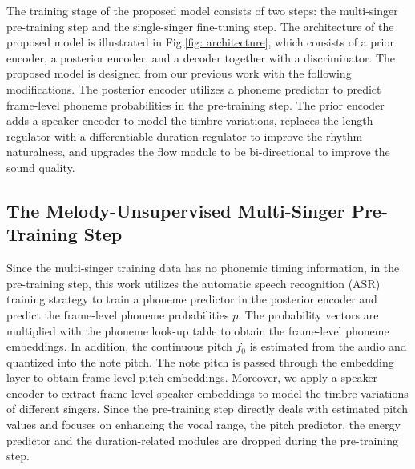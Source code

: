 The training stage of the proposed model consists of two steps: the multi-singer pre-training step and the single-singer fine-tuning step. The architecture of the proposed model is illustrated in Fig.\ref{fig: architecture}, which consists of a prior encoder, a posterior encoder, and a decoder together with a discriminator.
The proposed model is designed from our previous work \cite{zhou22f_interspeech} with the following modifications.
The posterior encoder utilizes a phoneme predictor to predict frame-level phoneme probabilities in the pre-training step. 
The prior encoder adds a speaker encoder to model the timbre variations, replaces the length regulator with a differentiable duration regulator to improve the rhythm naturalness, and upgrades the flow module to be bi-directional to improve the sound quality.





\subsection{The Melody-Unsupervised Multi-Singer Pre-Training Step}
Since the multi-singer training data has no phonemic timing information, in the pre-training step, this work utilizes the automatic speech recognition (ASR) training strategy to train a phoneme predictor in the posterior encoder and predict the frame-level phoneme probabilities $p$.
The probability vectors are multiplied with the phoneme look-up table to obtain the frame-level phoneme embeddings.
In addition, the continuous pitch $f_{0}$ is estimated from the audio and quantized into the note pitch.
The note pitch is passed through the embedding layer to obtain frame-level pitch embeddings.
Moreover, we apply a speaker encoder to extract frame-level speaker embeddings to model the timbre variations of different singers.
Since the pre-training step directly deals with estimated pitch values and focuses on enhancing the vocal range, the pitch predictor, the energy predictor and the duration-related modules are dropped during the pre-training step.



